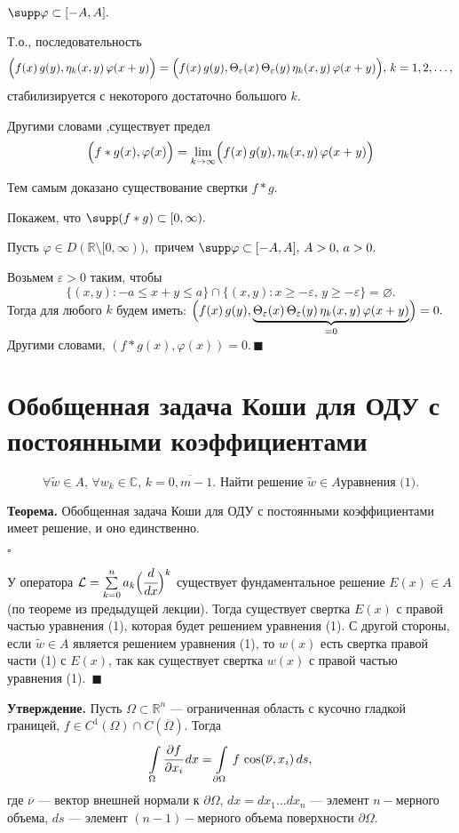 \documentclass[12pt,a4paper,draft]{article}
\DeclareRobustCommand*{\т}{~--- }
\DeclareRobustCommand*{\ч}{~-- }
\begin{document}
$\supp \varphi\subset[-A,A].$

Т.о., последовательность
$$\Bigl(f(x)\,g(y),\eta_k(x,y)\,\varphi(x+y)\Bigr)=
\Bigl(f(x)\,g(y),\Theta_{\varepsilon}(x)\,\Theta_{\varepsilon}(y)\,\eta_k(x,y)\,\varphi(x+y)\Bigr),\,k=1,2,\ldots,$$
стабилизируется с некоторого достаточно большого $k$.

Другими словами ,существует предел
$$\Bigl(f*g(x),\varphi(x)\Bigr)
=\lim\limits_{k\to\infty}\Bigl(f(x)\,g(y),\eta_k(x,y)\,\varphi(x+y)\Bigr)$$

Тем самым доказано существование свертки $f*g.$

Покажем, что $\supp (f*g)\subset[0,\infty).$

Пусть $\varphi \in D(\mathbb R\setminus [0,\infty)),$ причем
$\supp \varphi\subset[-A,A],\, A>0,\,a>0.$

Возьмем $\varepsilon>0$ таким, чтобы $$\{(x,y)\colon -a\le x+y\le
a\}\cap\{(x,y)\colon x\ge-\varepsilon,\,
y\ge-\varepsilon\}=\varnothing.$$ Тогда для любого $k$ будем
иметь:
$\Bigl(f(x)\,g(y),\underbrace{\Theta_{\varepsilon}(x)\,\Theta_{\varepsilon}(y)\,\eta_k(x,y)\,\varphi(x+y)}_{=0}\Bigr)=0.$
Другими словами, $(f*g(x),\varphi(x))=0.\,\blacksquare$

\section{Обобщенная задача Коши для ОДУ с постоянными коэффициентами}

$$\forall \tilde w\in A,\,\forall w_k\in \mathbb
C,\,k=\overline{0,m-1}.\mbox{ Найти решение }\tilde w\in A \mbox{
уравнения (1).}$$

\textbf{Теорема.} Обобщенная задача Коши для ОДУ с постоянными
коэффициентами имеет решение, и оно единственно.

$\square$

У оператора $\mathcal L=\sum\limits_{k=0}^n a_k \Bigl(\cfrac
d{dx}\Bigr)^k$ существует фундаментальное решение $E(x)\in A$ (по
теореме из предыдущей лекции). Тогда существует свертка $E(x)$ с
правой частью уравнения (1), которая будет решением уравнения (1).
С другой стороны, если $\tilde w\in A$ является решением уравнения
(1), то $w(x)$ есть свертка правой части (1) с $E(x)$, так как
существует свертка $w(x)$ с правой частью уравнения (1).
$\,\blacksquare$


\textbf{Утверждение.} Пусть $\Omega\subset\mathbb R^n$ ---
ограниченная область с кусочно гладкой границей, $f\in
C^1(\Omega)\cap C(\overline{\Omega}).$ Тогда
$$\int\limits_{\Omega}\cfrac{\partial f}{\partial
x_i}\,dx=\int\limits_{\partial\Omega}\,f\,\cos(\overline{\nu},x_i)\,ds,$$
где $\overline{\nu}$ --- вектор внешней нормали к
$\partial\Omega,\,dx=dx_1\ldots dx_n$ --- элемент $n-$мерного
объема, $ds$ --- элемент $(n-1)-$мерного объема поверхности
$\partial\Omega$.
\end{document}

